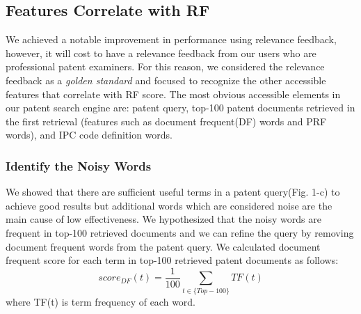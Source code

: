 \documentclass{sig-alternate}
\begin{document}
\subsection{Features Correlate with RF}
We achieved a notable improvement in performance using relevance feedback, however, it will cost to have a relevance feedback from our users who are professional patent examiners. For this reason, we considered the relevance feedback as a {\em golden standard} and focused to recognize the other accessible features that correlate with RF score. The most obvious accessible elements in our patent search engine are: patent query, top-100 patent documents retrieved in the first retrieval (features such as document frequent(DF) words and PRF words), and IPC code definition words.  
\subsubsection{Identify the Noisy Words}
We showed that there are sufficient useful terms in a patent query(Fig. 1-c) to achieve good results but additional words which are considered noise are the main cause of low effectiveness. We hypothesized that the noisy words are frequent in top-100 retrieved documents and we can refine the query by removing document frequent words from the patent query. We calculated document frequent score for each term in top-100 retrieved patent documents as follows:
\begin{equation}
score_{DF}(t)= \frac{1}{100}\sum_{t\in \lbrace Top-100\rbrace} TF(t)  
 \label{eq:dfscore}
\end{equation}
where TF(t) is term frequency of each word. 
\end{document}

